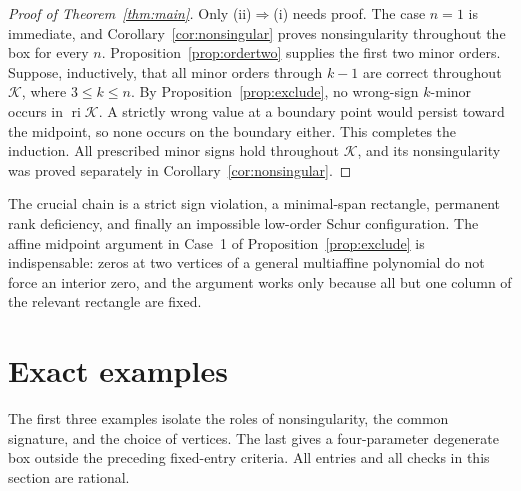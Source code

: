 \documentclass[10pt,a4paper]{article}
\theoremstyle{definition}
\theoremstyle{remark}
\numberwithin{equation}{section}
\newcommand{\K}{\mathcal K}
\DeclareMathOperator{\ri}{ri}
\begin{document}
\begin{proof}[Proof of Theorem~\ref{thm:main}]
Only (ii)$\Rightarrow$(i) needs proof. The case $n=1$ is immediate, and
Corollary~\ref{cor:nonsingular} proves nonsingularity throughout the box
for every $n$. Proposition~\ref{prop:ordertwo} supplies the first two
minor orders. Suppose, inductively, that all minor orders through $k-1$
are correct throughout $\K$, where $3\leq k\leq n$. By
Proposition~\ref{prop:exclude}, no wrong-sign $k$-minor occurs in
$\ri\K$. A strictly wrong value at a boundary point would persist toward
the midpoint, so none occurs on the boundary either. This completes the
induction. All prescribed minor signs hold throughout $\K$, and its
nonsingularity was proved separately in Corollary~\ref{cor:nonsingular}.
\end{proof}

The crucial chain is a strict sign violation, a minimal-span rectangle,
permanent rank deficiency, and finally an impossible low-order Schur
configuration. The affine midpoint argument in Case~1 of
Proposition~\ref{prop:exclude} is indispensable: zeros at two vertices of
a general multiaffine polynomial do not force an interior zero, and the
argument works only because all but one column of the relevant rectangle
are fixed.

\section{Exact examples}\label{sec:examples}

The first three examples isolate the roles of nonsingularity,
the common signature, and the choice of vertices. The last gives a
four-parameter degenerate box outside the preceding fixed-entry
criteria. All entries and all checks in this section are rational.
\end{document}
